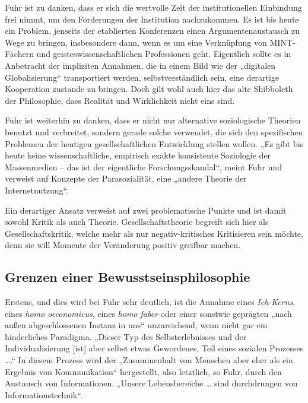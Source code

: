 \documentclass[12pt,a4paper]{article}
\begin{document}
Fuhr ist zu danken, dass er sich die wertvolle Zeit der institutionellen
Einbindung frei nimmt, um den Forderungen der Institution nachzukommen. Es ist
bis heute ein Problem, jenseits der etablierten Konferenzen einen
Argumentenaustausch zu Wege zu bringen, insbesondere dann, wenn es um eine
Verknüpfung von MINT-Fächern und geisteswissenschaftlichen Professionen geht.
Eigentlich sollte es in Anbetracht der impliziten Annahmen, die in einem Bild
wie der „digitalen Globalisierung“ transportiert werden, selbstverständlich
sein, eine derartige Kooperation zustande zu bringen. Doch gilt wohl auch hier
das alte Shibboleth der Philosophie, dass Realität und Wirklichkeit nicht eins
sind.

Fuhr ist weiterhin zu danken, dass er nicht nur alternative soziologische
Theorien benutzt und verbreitet, sondern gerade solche verwendet, die sich den
spezifischen Problemen der heutigen gesellschaftlichen Entwicklung stellen
wollen. „Es gibt bis heute keine wissenschaftliche, empirisch exakte
konsistente Soziologie der Massenmedien – das ist der eigentliche
Forschungsskandal“, meint Fuhr und verweist auf Konzepte der Parasozialität,
eine „andere Theorie der Internetnutzung“.

Ein derartiger Ansatz verweist auf zwei problematische Punkte und ist damit
sowohl Kritik als auch Theorie. Gesellschaftstheorie begreift sich hier als
Gesellschaftskritik, welche mehr als nur negativ-kritisches Kritisieren sein
möchte, denn sie will Momente der Veränderung positiv greifbar machen.

\subsection*{Grenzen einer Bewusstseinsphilosophie}

Erstens, und dies wird bei Fuhr sehr deutlich, ist die Annahme eines
\emph{Ich-Kerns}, eines \emph{homo oeconomicus}, eines \emph{homo faber} oder
einer sonstwie geprägten „nach außen abgeschlossenen Instanz in uns“
unzureichend, wenn nicht gar ein hinderliches Paradigma. „Dieser Typ des
Selbsterlebnisses und der Individualisierung [ist] aber selbst etwas
Gewordenes, Teil eines sozialen Prozesses {\ldots}.“ In diesem Prozess wird der
„Zusammenhalt von Menschen aber eher als ein Ergebnis von Kommunikation“
hergestellt, also letztlich, so Fuhr, durch den Austausch von
Informationen. „Unsere Lebensbereiche {\ldots} sind durchdrungen von
Informationstechnik“.
\end{document}
